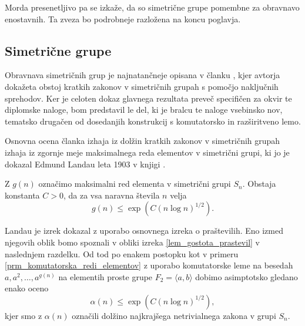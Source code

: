  Morda presenetljivo pa se izkaže, da so simetrične grupe pomembne za obravnavo enostavnih. Ta zveza bo podrobneje razložena na koncu poglavja. 

\subsection{Simetrične grupe}\label{sec_simetricne_grupe}


Obravnava simetričnih grup je najnatančneje opisana v članku \cite{Kozma_Thom_2016}, kjer avtorja dokažeta obstoj kratkih zakonov v simetričnih grupah s pomočjo naključnih sprehodov.
Ker je celoten dokaz glavnega rezultata preveč specifičen za okvir te diplomske naloge, bom predstavil le del, ki je bralcu te naloge vsebinsko nov, tematsko drugačen od dosedanjih konstrukcij s komutatorsko in razširitveno lemo.

Osnovna ocena članka \cite{Kozma_Thom_2016} izhaja iz dolžin kratkih zakonov v simetričnih grupah izhaja iz zgornje meje maksimalnega reda elementov v simetrični grupi,
ki jo je dokazal Edmund Landau leta 1903 v knjigi \cite{Landau_1903}.

\begin{trditev}[Landau] \label{trd_landau}
    Z $g(n)$ označimo maksimalni red elementa v simetrični grupi $S_n$. Obstaja konstanta $C > 0$, da za vsa naravna števila $n$ velja \begin{equation*}
        g(n) \le \exp(C (n \log n)^{1 / 2}).
    \end{equation*}
\end{trditev}
Landau je izrek dokazal z uporabo osnovnega izreka o praštevilih. Eno izmed njegovih oblik bomo spoznali v obliki izreka \ref{lem_gostota_prastevil} v naslednjem razdelku.  
Od tod po enakem postopku kot v primeru \ref{prm_komutatorska_redi_elementov} z uporabo komutatorske leme na besedah $a, a^2, \ldots, a^{g(n)}$ na elementih proste grupe $F_2 = \langle a, b \rangle$ dobimo asimptotsko gledano enako oceno \begin{equation*}
    \alpha(n)  \le \exp(C (n \log n)^{1 / 2}),
\end{equation*}  
kjer smo z $\alpha(n)$ označili dolžino najkrajšega netrivialnega zakona v grupi $S_n$.

